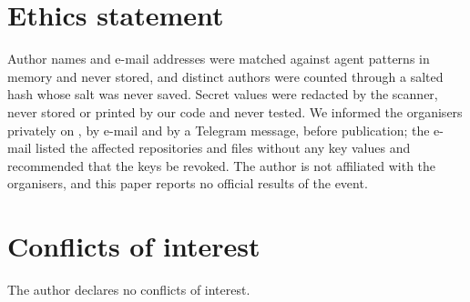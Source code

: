 \documentclass{article}
\begin{document}
\section*{Ethics statement}
Author names and e-mail addresses were matched against agent patterns in memory and never stored, and distinct authors were counted through a salted hash whose salt was never saved. Secret values were redacted by the scanner, never stored or printed by our code and never tested. We informed the organisers privately on \disclosuredate{}, by e-mail and by a Telegram message, before publication; the e-mail listed the affected repositories and files without any key values and recommended that the keys be revoked. The author is not affiliated with the organisers, and this paper reports no official results of the event.

\section*{Conflicts of interest}
The author declares no conflicts of interest.



\end{document}

